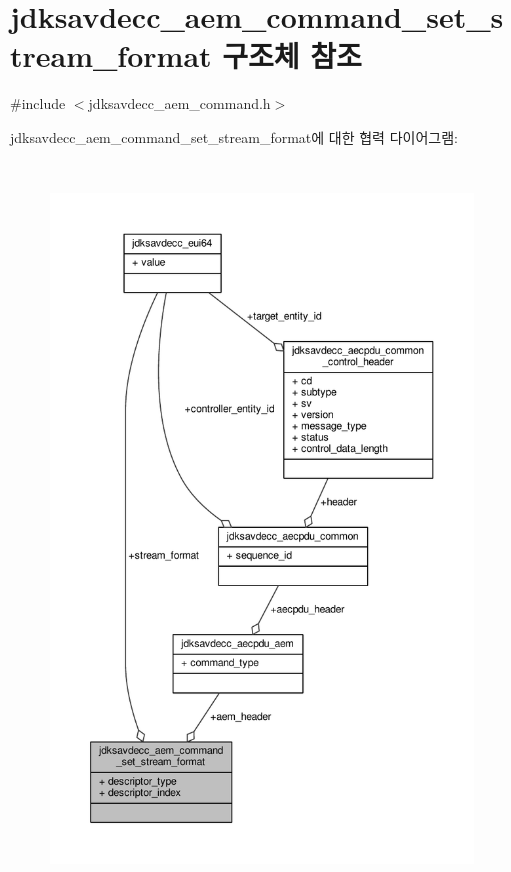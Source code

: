 \hypertarget{structjdksavdecc__aem__command__set__stream__format}{}\section{jdksavdecc\+\_\+aem\+\_\+command\+\_\+set\+\_\+stream\+\_\+format 구조체 참조}
\label{structjdksavdecc__aem__command__set__stream__format}


{\ttfamily \#include $<$jdksavdecc\+\_\+aem\+\_\+command.\+h$>$}



jdksavdecc\+\_\+aem\+\_\+command\+\_\+set\+\_\+stream\+\_\+format에 대한 협력 다이어그램\+:
\nopagebreak
\begin{figure}[H]
\begin{center}
\leavevmode
\includegraphics[height=550pt]{structjdksavdecc__aem__command__set__stream__format__coll__graph}
\end{center}
\end{figure}
